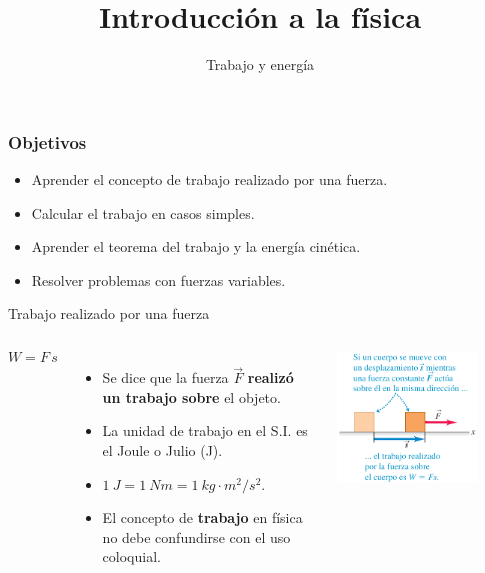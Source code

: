 \documentclass[9pt, aspectratio=169]{beamer}
\title{Introducción a la física}
\subtitle{Trabajo y energía}
\begin{document}
\maketitle
\begin{frame}
  \frametitle{Objetivos}
\Large

\begin{itemize}
 \item Aprender el concepto de trabajo realizado por una fuerza.
 \item Calcular el trabajo en casos simples.
 \item Aprender el teorema del trabajo y la energía cinética.
 \item Resolver problemas con fuerzas variables.
\end{itemize}
\end{frame}

\begin{frame}{Trabajo realizado por una fuerza}
\begin{columns} 
\[ W = F \, s \]
\begin{itemize}
\item Se dice que la fuerza $\vec{F}$ \textbf{realizó un trabajo sobre} el objeto.
\item La unidad de trabajo en el S.I. es el Joule o Julio (\unit{J}).
\item $\qty{1}{J} = \qty{1}{N m} = \qty{1}{kg \cdot m^2 / s^2} $.
\item El concepto de \textbf{trabajo} en física no debe confundirse con el uso coloquial.
\end{itemize}
\begin{center}
    \includegraphics[width=0.8\textwidth]{figs/fig-01.png}
\end{center}
\end{columns}
\end{frame}
\end{document}
